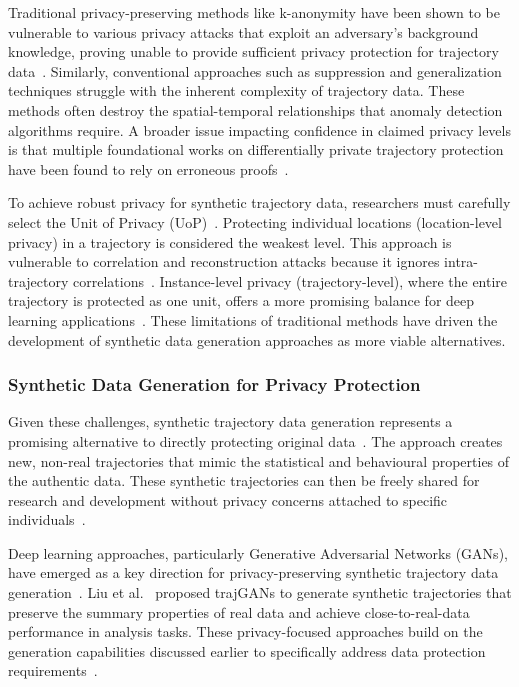\documentclass[runningheads]{llncs}
\begin{document}
Traditional privacy-preserving methods like k-anonymity have been shown to be vulnerable to various privacy attacks that exploit an adversary's background knowledge, proving unable to provide sufficient privacy protection for trajectory data~\cite{Chen2011DPTP,Buchholz2022RAoPT,Jin2023SurveyExpStudy}. Similarly, conventional approaches such as suppression and generalization techniques struggle with the inherent complexity of trajectory data. These methods often destroy the spatial-temporal relationships that anomaly detection algorithms require. A broader issue impacting confidence in claimed privacy levels is that multiple foundational works on differentially private trajectory protection have been found to rely on erroneous proofs~\cite{Buchholz2024SoK,Primault2014DPLPP,Errounda2019AnalysisDPLocation}.

To achieve robust privacy for synthetic trajectory data, researchers must carefully select the Unit of Privacy (UoP)~\cite{Buchholz2024SoK,Primault2019LongRoad}. Protecting individual locations (location-level privacy) in a trajectory is considered the weakest level. This approach is vulnerable to correlation and reconstruction attacks because it ignores intra-trajectory correlations~\cite{Buchholz2024SoK,Buchholz2022RAoPT,Primault2014DPLPP,Errounda2019AnalysisDPLocation}. Instance-level privacy (trajectory-level), where the entire trajectory is protected as one unit, offers a more promising balance for deep learning applications~\cite{Buchholz2024SoK}. These limitations of traditional methods have driven the development of synthetic data generation approaches as more viable alternatives.

\subsubsection{Synthetic Data Generation for Privacy Protection}

Given these challenges, synthetic trajectory data generation represents a promising alternative to directly protecting original data~\cite{Buchholz2024SoK,Rao2021LSTMTrajGAN,Liu2018TrajGANs}. The approach creates new, non-real trajectories that mimic the statistical and behavioural properties of the authentic data. These synthetic trajectories can then be freely shared for research and development without privacy concerns attached to specific individuals~\cite{Rao2021LSTMTrajGAN,Liu2018TrajGANs,Qu2020GANs5G}.

Deep learning approaches, particularly Generative Adversarial Networks (GANs), have emerged as a key direction for privacy-preserving synthetic trajectory data generation~\cite{Buchholz2024SoK,Liu2018TrajGANs,Rao2021LSTMTrajGAN,Qu2020GANs5G}. Liu et al.~\cite{Liu2018TrajGANs} proposed trajGANs to generate synthetic trajectories that preserve the summary properties of real data and achieve close-to-real-data performance in analysis tasks. These privacy-focused approaches build on the generation capabilities discussed earlier to specifically address data protection requirements~\cite{Rao2021LSTMTrajGAN,Qu2020GANs5G,Buchholz2024SoK,Ponomareva2023HowToDPfyML}.
\end{document}
